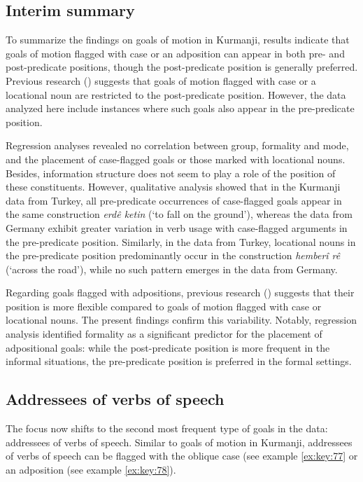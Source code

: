 \subsection{Interim summary}\label{sec:key:6.3.4}

To summarize the findings on goals of motion in Kurmanji, results indicate that goals of motion flagged with case or an adposition can appear in both pre- and post-predicate positions, though the post-predicate position is generally preferred. Previous research (\citealt{Haig2014, Gundogdu2019}) suggests that goals of motion flagged with case or a locational noun are restricted to the post-predicate position. However, the data analyzed here include instances where such goals also appear in the pre-predicate position.

Regression analyses revealed no correlation between group, formality and mode, and the placement of case-flagged goals or those marked with locational nouns. Besides, information structure does not seem to play a role of the position of these constituents. However, qualitative analysis showed that in the Kurmanji data from Turkey, all pre-predicate occurrences of case-flagged goals appear in the same construction \textit{erdê ketin} (‘to fall on the ground’), whereas the data from Germany exhibit greater variation in verb usage with case-flagged arguments in the pre-predicate position. Similarly, in the data from Turkey, locational nouns in the pre-predicate position predominantly occur in the construction \textit{hemberî rê} (‘across the road’), while no such pattern emerges in the data from Germany.

Regarding goals flagged with adpositions, previous research (\citealt{Haig2014, Gundogdu2019}) suggests that their position is more flexible compared to goals of motion flagged with case or locational nouns. The present findings confirm this variability. Notably, regression analysis identified formality as a significant predictor for the placement of adpositional goals: while the post-predicate position is more frequent in the informal situations, the pre-predicate position is preferred in the formal settings.

\subsection{Addressees of verbs of speech}\label{sec:key:6.3.5}

The focus now shifts to the second most frequent type of goals in the data: addressees of verbs of speech. Similar to goals of motion in Kurmanji, addressees of verbs of speech can be flagged with the oblique case (see example \ref{ex:key:77} or an adposition (see example \ref{ex:key:78}).



